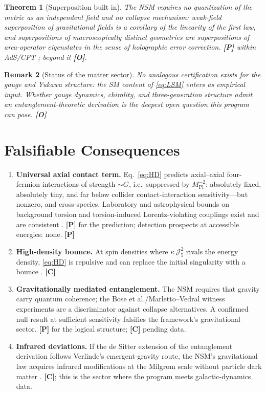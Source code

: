 \documentclass[11pt]{article}
\newtheorem{theorem}{Theorem}[section]
\newtheorem{remark}[theorem]{Remark}
\theoremstyle{definition}
\newcommand{\pP}{\textbf{[P]}}
\newcommand{\pC}{\textbf{[C]}}
\newcommand{\pO}{\textbf{[O]}}
\begin{document}
\begin{theorem}[Superposition built in]
The NSM requires no quantization of the metric as an independent field and
no collapse mechanism: weak-field superposition of gravitational fields is
a corollary of the linearity of the first law, and superpositions of
macroscopically distinct geometries are superpositions of area-operator
eigenstates in the sense of holographic error correction. \pP{} within
AdS/CFT \cite{Harlow2017,McGwier2026a}; beyond it \pO{}.
\end{theorem}

\begin{remark}[Status of the matter sector]
No analogous certification exists for the gauge and Yukawa structure: the
SM content of \eqref{eq:LSM} enters as empirical input. Whether gauge
dynamics, chirality, and three-generation structure admit an
entanglement-theoretic derivation is the deepest open question this
program can pose. \pO{}
\end{remark}

\section{Falsifiable Consequences}

\begin{enumerate}[itemsep=2pt]
\item \textbf{Universal axial contact term.} Eq.~\eqref{eq:HD} predicts
axial--axial four-fermion interactions of strength $\sim G$, i.e.\
suppressed by $M_{\mathrm{Pl}}^{-2}$: absolutely fixed, absolutely tiny,
and far below collider contact-interaction sensitivity---but nonzero, and
cross-species. Laboratory and astrophysical bounds on background torsion
and torsion-induced Lorentz-violating couplings exist and are consistent
\cite{KRT2008,Shapiro2002}. \pP{} for the prediction; detection prospects
at accessible energies: none. \pP{}
\item \textbf{High-density bounce.} At spin densities where
$\kappa\,\mathcal{J}_5^2$ rivals the energy density, \eqref{eq:HD} is
repulsive and can replace the initial singularity with a bounce
\cite{Trautman1973,Poplawski2010}. \pC{}
\item \textbf{Gravitationally mediated entanglement.} The NSM requires
that gravity carry quantum coherence; the Bose et al./Marletto--Vedral
witness experiments \cite{Bose2017,MarlettoVedral2017} are a
discriminator against collapse alternatives. A confirmed null result at
sufficient sensitivity falsifies the framework's gravitational sector.
\pP{} for the logical structure; \pC{} pending data.
\item \textbf{Infrared deviations.} If the de Sitter extension of the
entanglement derivation follows Verlinde's emergent-gravity route, the
NSM's gravitational law acquires infrared modifications at the Milgrom
scale without particle dark matter \cite{Verlinde2017,Milgrom1983}. \pC{};
this is the sector where the program meets galactic-dynamics data.
\end{enumerate}
\end{document}

